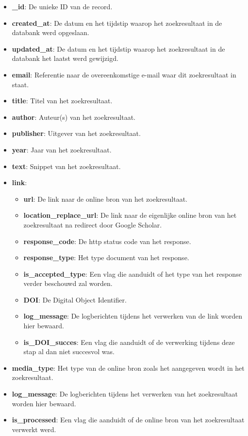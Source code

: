 \begin{itemize}
    \item \textbf{\_id}: De unieke ID van de record.
    \item \textbf{created\_at}: De datum en het tijdstip waarop het zoekresultaat in de databank werd opgeslaan.
    \item \textbf{updated\_at}: De datum en het tijdstip waarop het zoekresultaat in de databank het laatst werd gewijzigd. 
    \item \textbf{email}: Referentie naar de overeenkomstige e-mail waar dit zoekresultaat in staat.
    \item \textbf{title}: Titel van het zoekresultaat.
    \item \textbf{author}: Auteur(s) van het zoekresultaat. 
    \item \textbf{publisher}: Uitgever van het zoekresultaat.
    \item \textbf{year}: Jaar van het zoekresultaat.
    \item \textbf{text}: Snippet van het zoekresultaat.
    \item \textbf{link}: 
    \begin{itemize}
        \item \textbf{url}: De link naar de online bron van het zoekresultaat.
        \item \textbf{location\_replace\_url}: De link naar de eigenlijke online bron van het zoekresultaat na redirect door Google Scholar.
        \item \textbf{response\_code}: De http status code van het response.
        \item \textbf{response\_type}: Het type document van het response.
        \item \textbf{is\_accepted\_type}: Een vlag die aanduidt of het type van het response verder beschouwd zal worden.
        \item \textbf{DOI}: De Digital Object Identifier.
        \item \textbf{log\_message}: De logberichten tijdens het verwerken van de link worden hier bewaard.
        \item \textbf{is\_DOI\_succes}: Een vlag die aanduidt of de verwerking tijdens deze stap al dan niet succesvol was.
    \end{itemize}
    \item \textbf{media\_type}: Het type van de online bron zoals het aangegeven wordt in het zoekresultaat.
    \item \textbf{log\_message}: De logberichten tijdens het verwerken van het zoekresultaat worden hier bewaard. 
    \item \textbf{is\_processed}: Een vlag die aanduidt of de online bron van het zoekresultaat verwerkt werd.
\end{itemize}


